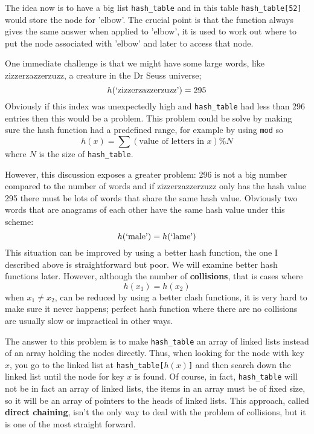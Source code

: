 \documentclass[11pt,a4paper]{scrartcl}
\begin{document}
The idea now is to have a big list \texttt{hash\_table} and in this
table \texttt{hash\_table[52]} would store the node for 'elbow'. The
crucial point is that the function always gives the same answer when
applied to 'elbow', it is used to work out where to put the node
associated with 'elbow' and later to access that node.

One immediate challenge is that we might have some large words, like
zizzerzazzerzuzz, a creature in the Dr Seuss universe;
\begin{equation}
h(\mbox{\lq{}zizzerzazzerzuzz\rq{}})=295
\end{equation}
Obviously if this index was unexpectedly high and \texttt{hash\_table}
had less than 296 entries then this would be a problem. This problem
could be solve by making sure the hash function had a predefined
range, for example by using \texttt{mod} so
\begin{equation}
h(x)=\sum{(\mbox{value of letters in }x)}\% N
\end{equation}
where $N$ is the size of \texttt{hash\_table}.

However, this discussion exposes a greater problem: 296 is not a big
number compared to the number of words and if zizzerzazzerzuzz only
has the hash value 295 there must be lots of words that share the same
hash value. Obviously two words that are anagrams of each other have
the same hash value under this scheme:
\begin{equation}
h(\mbox{\lq{}male\rq{}})=h(\mbox{\lq{}lame\rq{}})
\end{equation}
This situation can be improved by using a better hash function, the
one I described above is straightforward but poor. We will examine
better hash functions later. However, although the number of
\textbf{collisions}, that is cases where
\begin{equation}
h(x_1)=h(x_2)
\end{equation}
when $x_1\not=x_2$, can be reduced by using a better clash functions,
it is very hard to make sure it never happens; perfect hash function
where there are no collisions are usually slow or impractical in other
ways.

The answer to this problem is to make \texttt{hash\_table} an array of
linked lists instead of an array holding the nodes directly. Thus,
when looking for the node with key $x$, you go to the linked list at
\texttt{hash\_table[$h(x)$]} and then search down the linked list
until the node for key $x$ is found. Of course, in fact,
\texttt{hash\_table} will not be in fact an array of linked lists, the
items in an array must be of fixed size, so it will be an array of
pointers to the heads of linked lists. This approach, called
\textbf{direct chaining}, isn't the only way to deal with the problem
of collisions, but it is one of the most straight forward.
\end{document}
